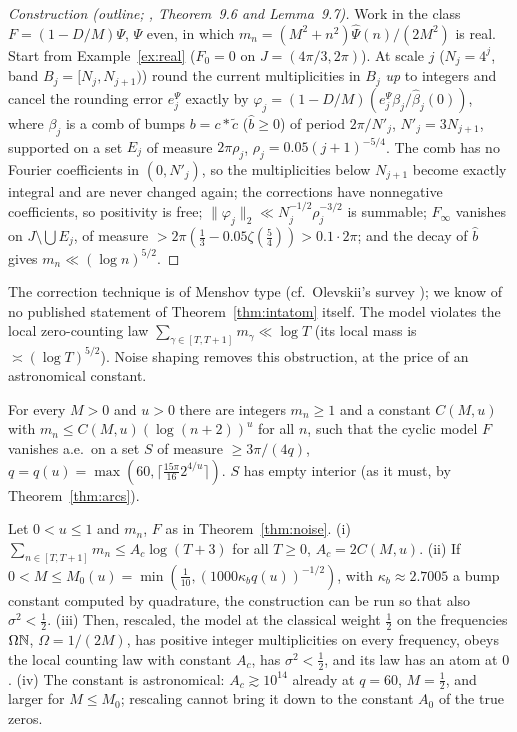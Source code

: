 \begin{proof}[Construction (outline; , Theorem~9.6 and Lemma~9.7)]
Work in the class $F=(1-D/M)\Psi$, $\Psi$ even, in which $m_n=(M^2+n^2)\hat\Psi(n)/(2M^2)$ is real. Start from Example~\ref{ex:real} ($F_0=0$ on $J=(4\pi/3,2\pi)$). At scale $j$ ($N_j=4^j$, band $B_j=[N_j,N_{j+1})$) round the current multiplicities in $B_j$ \emph{up} to integers and cancel the rounding error $e^\Psi_j$ exactly by $\varphi_j=(1-D/M)(e^\Psi_j\beta_j/\hat\beta_j(0))$, where $\beta_j$ is a comb of bumps $b=c*\tilde c$ ($\hat b\ge0$) of period $2\pi/N'_j$, $N'_j=3N_{j+1}$, supported on a set $E_j$ of measure $2\pi\rho_j$, $\rho_j=0.05(j+1)^{-5/4}$. The comb has no Fourier coefficients in $(0,N'_j)$, so the multiplicities below $N_{j+1}$ become exactly integral and are never changed again; the corrections have nonnegative coefficients, so positivity is free; $\|\varphi_j\|_2\ll N_j^{-1/2}\rho_j^{-3/2}$ is summable; $F_\infty$ vanishes on $J\setminus\bigcup E_j$, of measure $>2\pi(\frac13-0.05\zeta(\frac54))>0.1\cdot2\pi$; and the decay of $\hat b$ gives $m_n\ll(\log n)^{5/2}$.
\end{proof}

The correction technique is of Menshov type (cf.\ Olevskii's survey \cite{Olevskii}); we know of no published statement of Theorem~\ref{thm:intatom} itself. The model violates the local zero-counting law $\sum_{\gamma\in[T,T+1]}m_\gamma\ll\log T$ (its local mass is $\asymp(\log T)^{5/2}$). Noise shaping removes this obstruction, at the price of an astronomical constant.

\begin{theorem}\label{thm:noise}
For every $M>0$ and $u>0$ there are integers $m_n\ge1$ and a constant $C(M,u)$ with $m_n\le C(M,u)(\log(n+2))^u$ for all $n$, such that the cyclic model $F$ vanishes a.e.\ on a set $S$ of measure $\ge3\pi/(4q)$, $q=q(u)=\max(60,\lceil\frac{15\pi}{16}2^{4/u}\rceil)$. $S$ has empty interior (as it must, by Theorem~\ref{thm:arcs}).
\end{theorem}

\begin{corollary}[\rd{1 read}]\label{cor:noise}
Let $0<u\le1$ and $m_n$, $F$ as in Theorem~\ref{thm:noise}. \textup{(i)} $\sum_{n\in[T,T+1]}m_n\le A_c\log(T+3)$ for all $T\ge0$, $A_c=2C(M,u)$. \textup{(ii)} If $0<M\le M_0(u)=\min(\frac1{10},(1000\kappa_bq(u))^{-1/2})$, with $\kappa_b\approx2.7005$ a bump constant computed by quadrature, the construction can be run so that also $\sigma^2<\frac12$. \textup{(iii)} Then, rescaled, the model at the classical weight $\frac12$ on the frequencies $\Omega\mathbb N$, $\Omega=1/(2M)$, has positive integer multiplicities on every frequency, obeys the local counting law with constant $A_c$, has $\sigma^2<\frac12$, and its law has an atom at $0$. \textup{(iv)} The constant is astronomical: $A_c\gtrsim10^{14}$ already at $q=60$, $M=\frac12$, and larger for $M\le M_0$; rescaling cannot bring it down to the constant $A_0$ of the true zeros.
\end{corollary}

